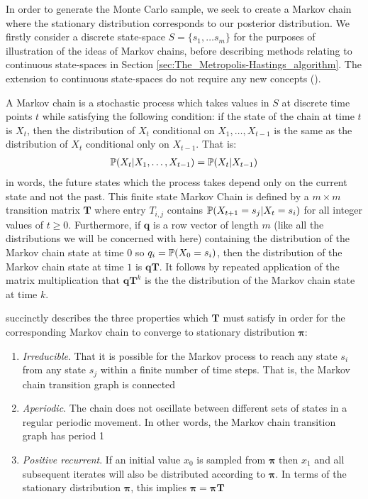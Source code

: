 In order to generate the Monte Carlo sample, we seek to create a Markov chain where the stationary distribution
corresponds to our posterior distribution. We firstly consider a discrete state-space \(S = \{s_1, \ldots s_m\}\) for
the purposes of illustration of the ideas of Markov chains, before describing methods relating to continuous
state-spaces in Section \ref{sec:The_Metropolis-Hastings_algorithm}. The extension to continuous state-spaces do not
require any new concepts (\cite{roberts1996Book, tierney1996}).

A Markov chain is a stochastic process which takes values in \(S\) at discrete time points \(t\) while satisfying the
following condition: if the state of the chain at time \(t\) is \(X_t\), then the distribution of \(X_t\) conditional on
\(X_1, \ldots, X_{t-1}\) is the same as the distribution of \(X_t\) conditional only on \(X_{t-1}\). That is:
\begin{align} 
\mathbb{P}(X_t | X_1, \ldots, X_{t-1}) = \mathbb{P}(X_t | X_{t-1})
\end{align}
in words, the future states which the process takes depend only on the current state and not the past. This finite state
Markov Chain is defined by a \(m \times m\) transition matrix \(\boldsymbol{T}\) where entry \(T_{i, j}\) contains
\(\mathbb{P}(X_{t+1} = s_j | X_t = s_i)\) for all integer values of \(t \geq 0\). Furthermore, if \(\boldsymbol{q}\) is a row
vector of length \(m\) (like all the distributions we will be concerned with here) containing the distribution of the
Markov chain state at time 0 so \(q_i = \mathbb{P}(X_0 = s_i)\), then the distribution of the Markov chain state at time
\(1\) is \(\boldsymbol{q} \boldsymbol{T}\). It follows by repeated application of the matrix multiplication that
\(\boldsymbol{q} \boldsymbol{T}^k\) is the the distribution of the Markov chain state at time \(k\).

\cite{roberts1996Book} succinctly describes the three properties which \(\boldsymbol{T}\) must satisfy in order for the
corresponding Markov chain to converge to stationary distribution \(\boldsymbol{\pi}\):
\begin{enumerate}
  \item \textit{Irreducible}. That it is possible for the Markov process to reach any state \(s_i\) from any state
  \(s_j\) within a finite number of time steps. That is, the Markov chain transition graph is connected
  \item \textit{Aperiodic}. The chain does not oscillate between different sets of states in a regular periodic
  movement. In other words, the Markov chain transition graph has period 1
  \item \textit{Positive recurrent}. If an initial value \(x_0\) is sampled from \(\boldsymbol{\pi}\) then \(x_1\)
  and all subsequent iterates will also be distributed according to \(\boldsymbol{\pi}\). In terms of the stationary
  distribution \(\boldsymbol{\pi}\), this implies \(\boldsymbol{\pi} = \boldsymbol{\pi} \boldsymbol{T}\)
\end{enumerate}

